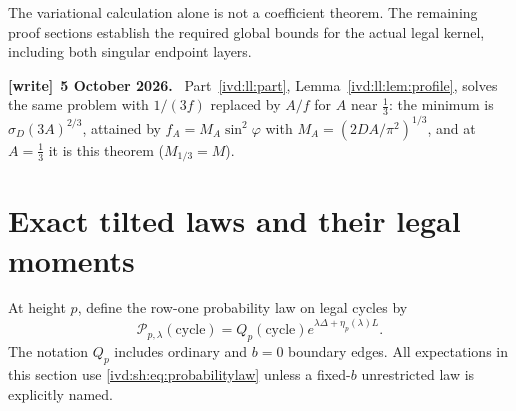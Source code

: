 \documentclass[11pt,letterpaper]{article}
\theoremstyle{remark}\newtheorem{remark}[theorem]{Remark}
\numberwithin{equation}{section}
\newcommand{\asymplaw}{\mathcal P}
\newenvironment{writenote}[1][]{\par\smallskip\begingroup\small
 \noindent\textbf{[write]}\if\relax\detokenize{#1}\relax\else~\textbf{#1.}\fi\ }%
 {\par\endgroup\smallskip}
\begin{document}
The variational calculation alone is not a coefficient theorem.
The remaining proof sections establish the required global bounds for the
actual legal kernel, including both singular endpoint layers.
\begin{writenote}[5 October 2026]
Part~\ref{ivd:ll:part}, Lemma~\ref{ivd:ll:lem:profile}, solves the same problem with $1/(3f)$ replaced by $A/f$ for $A$ near $\frac13$: the minimum is $\sigma_D(3A)^{2/3}$, attained by $f_A=M_A\sin^2\varphi$ with $M_A=(2DA/\pi^2)^{1/3}$, and at $A=\frac13$ it is this theorem ($M_{1/3}=M$).
\end{writenote}
\section{Exact tilted laws and their legal moments}\label{ivd:sh:sec:moments}
At height $p$, define the row-one probability law on legal cycles by
\begin{equation}\label{ivd:sh:eq:probabilitylaw}
 \asymplaw_{p,\lambda}(\text{cycle})
  =Q_p(\text{cycle})e^{\lambda\Delta+\eta_p(\lambda)L}.
\end{equation}
The notation $Q_p$ includes ordinary and $b=0$ boundary edges.
All expectations in this section use \eqref{ivd:sh:eq:probabilitylaw} unless
a fixed-$b$ unrestricted law is explicitly named.
\end{document}
